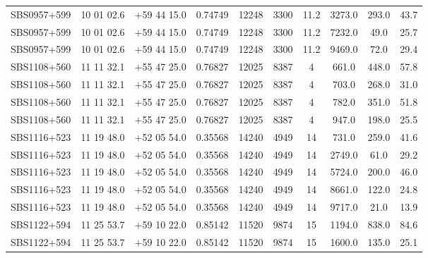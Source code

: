 \begin{landscape}
\begin{center}
\begin{longtable}{l c c c c c c c c c}
SBS0957+599  &             10 01 02.6  &         $+$59 44 15.0  &       0.74749  & 12248  &   3300  &       11.2  &      3273.0  &  293.0  &  43.7  \\
SBS0957+599  &             10 01 02.6  &         $+$59 44 15.0  &       0.74749  & 12248  &   3300  &       11.2  &      7232.0  &  49.0  &   25.7  \\
SBS0957+599  &             10 01 02.6  &         $+$59 44 15.0  &       0.74749  & 12248  &   3300  &       11.2  &      9469.0  &  72.0  &   29.4  \\
SBS1108+560  &             11 11 32.1  &         $+$55 47 25.0  &       0.76827  & 12025  &   8387  &       4  &         661.0  &   448.0  &  57.8  \\
SBS1108+560  &             11 11 32.1  &         $+$55 47 25.0  &       0.76827  & 12025  &   8387  &       4  &         703.0  &   268.0  &  31.0  \\
SBS1108+560  &             11 11 32.1  &         $+$55 47 25.0  &       0.76827  & 12025  &   8387  &       4  &         782.0  &   351.0  &  51.8  \\
SBS1108+560  &             11 11 32.1  &         $+$55 47 25.0  &       0.76827  & 12025  &   8387  &       4  &         947.0  &   198.0  &  25.5  \\
SBS1116+523  &             11 19 48.0  &         $+$52 05 54.0  &       0.35568  & 14240  &   4949  &       14  &        731.0  &   259.0  &  41.6  \\
SBS1116+523  &             11 19 48.0  &         $+$52 05 54.0  &       0.35568  & 14240  &   4949  &       14  &        2749.0  &  61.0  &   29.2  \\
SBS1116+523  &             11 19 48.0  &         $+$52 05 54.0  &       0.35568  & 14240  &   4949  &       14  &        5724.0  &  200.0  &  46.0  \\
SBS1116+523  &             11 19 48.0  &         $+$52 05 54.0  &       0.35568  & 14240  &   4949  &       14  &        8661.0  &  122.0  &  24.8  \\
SBS1116+523  &             11 19 48.0  &         $+$52 05 54.0  &       0.35568  & 14240  &   4949  &       14  &        9717.0  &  21.0  &   13.9  \\
SBS1122+594  &             11 25 53.7  &         $+$59 10 22.0  &       0.85142  & 11520  &   9874  &       15  &        1194.0  &  838.0  &  84.6  \\
SBS1122+594  &             11 25 53.7  &         $+$59 10 22.0  &       0.85142  & 11520  &   9874  &       15  &        1600.0  &  135.0  &  25.1  \\

\end{longtable}
\end{center}
\end{landscape}
